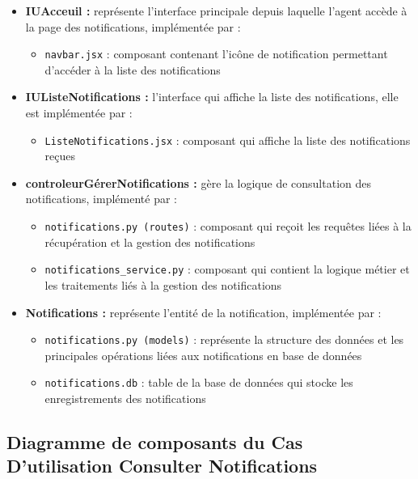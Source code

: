 \begin{itemize}[leftmargin=2em, topsep=4pt, itemsep=4pt]
  \item \textbf{IUAcceuil :} représente l'interface principale depuis laquelle l'agent accède à la page des notifications, implémentée par :
  \begin{itemize}[leftmargin=2em, topsep=2pt, itemsep=2pt]
    \item \texttt{navbar.jsx} : composant contenant l'icône de notification permettant d'accéder à la liste des notifications
  \end{itemize}
  \item \textbf{IUListeNotifications :} l'interface qui affiche la liste des notifications, elle est implémentée par :
  \begin{itemize}[leftmargin=2em, topsep=2pt, itemsep=2pt]
    \item \texttt{ListeNotifications.jsx} : composant qui affiche la liste des notifications reçues
  \end{itemize}
  \item \textbf{controleurGérerNotifications :} gère la logique de consultation des notifications, implémenté par :
  \begin{itemize}[leftmargin=2em, topsep=2pt, itemsep=2pt]
    \item \texttt{notifications.py (routes)} : composant qui reçoit les requêtes liées à la récupération et la gestion des notifications
    \item \texttt{notifications\_service.py} : composant qui contient la logique métier et les traitements liés à la gestion des notifications
  \end{itemize}
  \item \textbf{Notifications :} représente l'entité de la notification, implémentée par :
  \begin{itemize}[leftmargin=2em, topsep=2pt, itemsep=2pt]
    \item \texttt{notifications.py (models)} : représente la structure des données et les principales opérations liées aux notifications en base de données
    \item \texttt{notifications.db} : table de la base de données qui stocke les enregistrements des notifications
  \end{itemize}
\end{itemize}
\subsection{Diagramme de composants du Cas D'utilisation Consulter Notifications}


